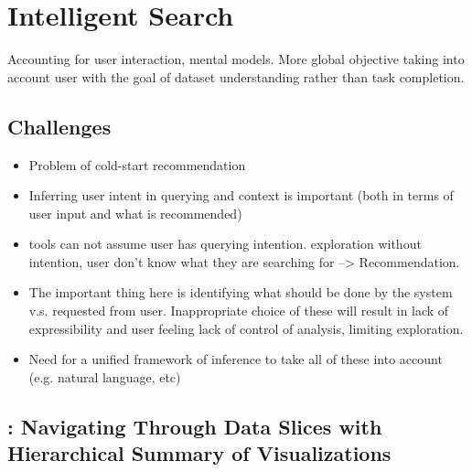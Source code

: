 \section{Intelligent Search}
Accounting for user interaction, mental models. More global objective taking into account user with the goal of dataset understanding rather than task completion.
\subsection{Challenges}
\begin{itemize}
\item Problem of cold-start recommendation
\item Inferring user intent in querying and context is important (both in terms of user input and what is recommended)
\item tools can not assume user has querying intention. exploration without intention, user don’t know what they are searching for --> Recommendation.
\item The important thing here is identifying what should be done by the system v.s. requested from user. Inappropriate choice of these will result in lack of expressibility and user feeling lack of control of analysis, limiting exploration.
\item Need for a unified framework of inference to take all of these into account (e.g. natural language, etc)
\end{itemize}
\subsection{\sbd: Navigating Through Data Slices with Hierarchical Summary of Visualizations}